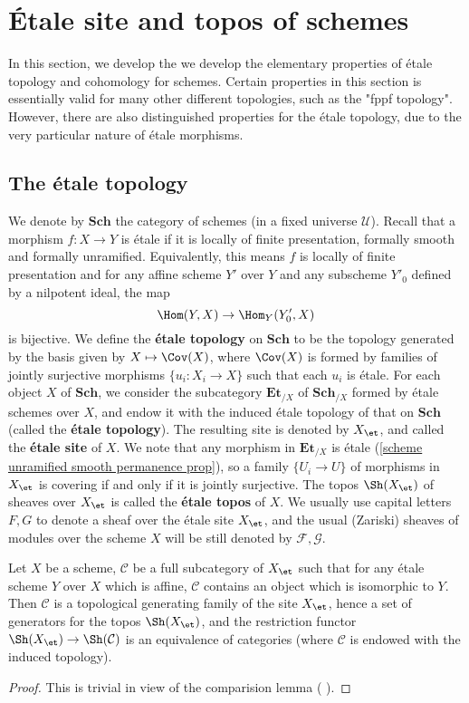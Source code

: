 \section{\'Etale site and topos of schemes}
In this section, we develop the we develop the elementary properties of \'etale topology and cohomology for schemes. Certain properties in this section is essentially valid for many other different topologies, such as the "fppf topology". However, there are also distinguished properties for the \'etale topology, due to the very particular nature of \'etale morphisms.

\subsection{The \'etale topology}
We denote by $\mathbf{Sch}$ the category of schemes (in a fixed universe $\mathscr{U}$). Recall that a morphism $f:X\to Y$ is \'etale if it is locally of finite presentation, formally smooth and formally unramified. Equivalently, this means $f$ is locally of finite presentation and for any affine scheme $Y'$ over $Y$ and any subscheme $Y'_0$ defined by a nilpotent ideal, the map
\[\Hom(Y,X)\to\Hom_Y(Y'_0,X)\]
is bijective. We define the \textbf{\'etale topology} on $\mathbf{Sch}$ to be the topology generated by the basis given by $X\mapsto\Cov(X)$, where $\Cov(X)$ is formed by families of jointly surjective morphisms $\{u_i:X_i\to X\}$ such that each $u_i$ is \'etale. For each object $X$ of $\mathbf{Sch}$, we consider the subcategory $\mathbf{Et}_{/X}$ of $\mathbf{Sch}_{/X}$ formed by \'etale schemes over $X$, and endow it with the induced \'etale topology of that on $\mathbf{Sch}$ (called the \textbf{\'etale topology}). The resulting site is denoted by $X_{\et}$, and called the \textbf{\'etale site} of $X$. We note that any morphism in $\mathbf{Et}_{/X}$ is \'etale (\cref{scheme unramified smooth permanence prop}), so a family $\{U_i\to U\}$ of morphisms in $X_\et$ is covering if and only if it is jointly surjective. The topos $\Sh(X_{\et})$ of sheaves over $X_\et$ is called the \textbf{\'etale topos} of $X$. We usually use capital letters $F,G$ to denote a sheaf over the \'etale site $X_\et$, and the usual (Zariski) sheaves of modules over the scheme $X$ will be still denoted by $\mathscr{F},\mathscr{G}$.

\begin{proposition}\label{scheme etale site small generator exist}
Let $X$ be a scheme, $\mathcal{C}$ be a full subcategory of $X_\et$ such that for any \'etale scheme $Y$ over $X$ which is affine, $\mathcal{C}$ contains an object which is isomorphic to $Y$. Then $\mathcal{C}$ is a topological generating family of the site $X_\et$, hence a set of  generators for the topos $\Sh(X_\et)$, and the restriction functor $\Sh(X_\et)\to\Sh(\mathcal{C})$ is an equivalence of categories (where $\mathcal{C}$ is endowed with the induced topology).
\end{proposition}
\begin{proof}
This is trivial in view of the comparision lemma (\cite{SGA4-1} ).
\end{proof}

